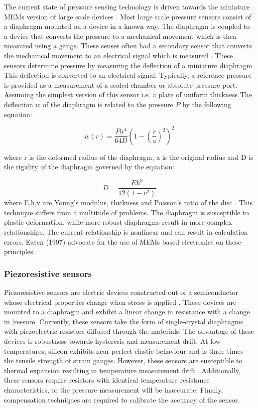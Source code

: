 The current state of pressure sensing technology is driven towards the miniature MEMs version of large scale devices \cite{eaton1997micromachined}. Most large scale pressure sensors consist of a diaphragm mounted on a device in a known way. The diaphragm is coupled to a device that converts the pressure to a mechanical movement which is then measured using a gauge. These senses often had a secondary sensor that converts the mechanical movement to an electrical signal which is measured \cite{eaton1997micromachined}. These sensors determine pressure by measuring the deflection of a miniature diaphragm. This deflection is converted to an electrical signal. Typically, a reference pressure is provided as a measurement of a sealed chamber or absolute pressure port. Assuming the simplest version of this sensor i.e. a plate of uniform thickness \cite{eaton1997micromachined} The deflection $w$ of the diaphragm is related to the pressure  $P$ by the following equation: \cite{eaton1997micromachined}

\begin{equation}
	w(r) = \frac{Pa^4}{64D}(1- (\frac{r}{a})^2)^2
\end{equation}

where r is the deformed radius of the diaphragm, a is the original radius and D is the  rigidity of the diaphragm governed by the equation:

\begin{equation}
	D = \frac{Eh^3}{12(1-v^2)}
\end{equation}
where E,h,v are Young's modulus, thickness and Poisson's ratio of the disc \cite{eaton1997micromachined}. This technique suffers from a multitude of problems. The diaphragm is susceptible to plastic deformation, while more robust diaphragms result in more complex relationships. The current relationship is nonlinear and can result in calculation errors. Eaten (1997) advocate for the use of MEMs based electronics on these principles.

\subsubsection{Piezoresistive sensors}

Piezoresistive sensors are electric devices constructed out of a semiconductor whose electrical properties change when stress is applied \cite{eaton1997micromachined}. These devices are mounted to a diaphragm and exhibit a linear change in resistance with a change in [ressure. Currently, these sensors take the form of single-crystal diaphragms with piezoelectric resistors diffused through the materials. The advantage of these devices is robustness towards hysteresis and measurement drift. At low temperatures, silicon exhibits near-perfect elastic behaviour and is three times the tensile strength of strain gauges\cite{eaton1997micromachined}. However, these sensors are susceptible to thermal expansion resulting in temperature measurement drift \cite{samaun1971ic}. Additionally, these sensors require resistors with identical temperature resistance characteristics, or the pressure measurement will be inaccurate. Finally, compensation techniques are required to calibrate the accuracy of the sensor.

